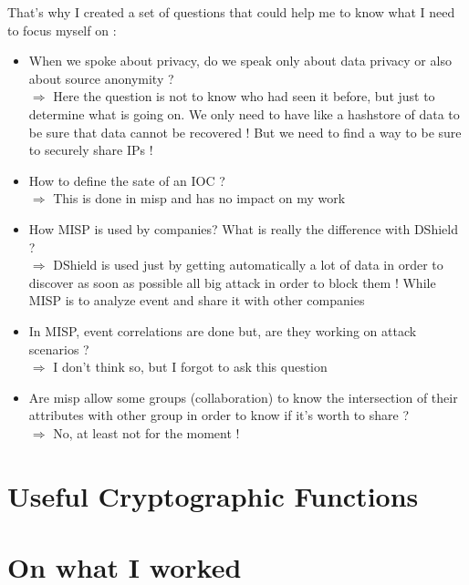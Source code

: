 \documentclass{eplmastersthesis}
\begin{document}
That's why I created a set of questions that could help me to know what I need to focus myself on :
\begin{itemize}
\item When we spoke about privacy, do we speak only about data privacy or also about source anonymity ? \\
$\Rightarrow$ Here the question is not to know who had seen it before, but just to determine what is going on. We only need to have like a hashstore of data to be sure that data cannot be recovered ! But we need to find a way to be sure to securely share IPs !
\item How to define the sate of an IOC ?\\
 $\Rightarrow$ This is done in misp and has no impact on my work
\item How MISP is used by companies? What is really the difference with DShield ?\\
$\Rightarrow$ DShield is used just by getting automatically a lot of data in order to discover as soon as possible all big attack in order to block them ! While MISP is to analyze event and share it with other companies
\item In MISP, event correlations are done but, are they working on attack scenarios ?\\
$\Rightarrow$ I don't think so, but I forgot to ask this question
\item Are misp allow some groups (collaboration) to know the intersection of their attributes with other group in order to know if it's worth to share ?\\
 $\Rightarrow$ No, at least not for the moment !
\end{itemize}

\section{Useful Cryptographic Functions}

\section{On what I worked}
\end{document}

